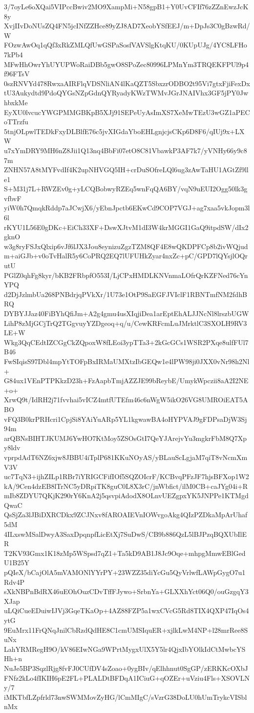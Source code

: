 3/7oyLe6oXQai5VIPccBwiv2MO9XampMi+N58gpB1+Y0UvCFIf76zZZnEwzJcK8y
XvjIIvDoNUsZQ4FN5jcINfZZHce89yZJ8AD7XeobYSfEEJ/m+DpJs3C0gBzwRd/W
FOzwAwOq1qQf3xRkZMLQfUwGSPaSosfVAVSlgKtqKU/0KUpUJg/4YC8LFHo7kPb4
MFwHhOwrYhUYUPWoRaiDBb5gwO8SPoZec80996LPMnYm3TRQEKFPUl9p4f96FTsV
0szRNVYd478RwxaAIRFlqVDSNliAN4lKaQZT5SbxzrODBO2t95Vi7gtxFjiFexDx
tU3Aukydtd9PdoQYGsNZpGdnQYRyadyKWzTWMvJGrJNAIVhx3GF5jPY0JwhbxkMe
EyXU0lvcucYWGPMMGBKpB5XJj91SEPeUyAsImXS7XeMwTEzU3wGZ1aPECoTTrzfu
5tnjOLpwlTEDkFxyDLBlfE76c5jvXIGdaYboEHLgnjcjsCKp6D8F6/qIUj9x+LXW
u7xYmDRY9MH6nZ8Jii1Q13nq4BbFi07etO8C81VbawkP3AF7k7/yVNHy66y9c87m
ZNHN57A8tMYFvdIf4K2upNHVGQ5IH+crDuSOfreLQl6ug3zAwTaHU1AGtZf9lle1
S+M31j7L+RWZEv0g+yLCQBobwyRZEq5wnFqQA6BY/vqN9uEUI2Ogg50lk3gvfbvF
yiW0h7QmqkRddp7aJCwjX6/yEbnJpctb6EKwCd9COP7VGJ+ag7xaa5vkJopm3l6l
rKYU1L56E0gDKc+EiCh33XF+DswXJtvM1dI3W4krMGGI1GaQ9itpdSW/dIx2gknO
w3g8ryFSJxQlxip6vJf6lJX3Jou8eynizuZgzTZM8QF4E8wQKDPFCp8b2ivWQjud
m+aiGJb+v0oTvHalR5y6CoPRQ2EQ7lUFUHkZyar4nxZc+pC/GPD7lQYsjlOQrutU
PGlZ0qhFg8kyr/bKB2FRbpfO553I/LjCPxHMDLKNVnmaLOfrQrKZFNed76cYnYPQ
d2DjJzlmbUa268PNBdrjqPVkXr/1U73e1OtP9SaEGFJVIclF1RBNTmfNM2fdhBRQ
DYBYJJaz40FiBYhQfiJm+A2g4gmu4usXIqjiDea1arEptEhALJJNcNl8lrszbUGW
LihP8zMjGCjTrQ2TGgvuyYZDgeoq+q/u/CewKRFcmLuJMrktlC3SXOLH9RV3LE+W
Wkg3QqCEdtIZCGgCkZQpoxW8fLEoi3ypTTa3+2kGcGCs1WSR2PXqe8ulfFUl7B46
FwSIqisS97Dbl4mpYtTOFpBxIRMaUMXtzIbGEQw1e4lPW98ji0JXX0vNr98h2Nl+
G84ux1VEnPTPKkzD23h+FzAapbTmjAZZJE99bReybE/UmykWpczii8aA2I2NE+o+
XrwQ9t/IdRH2j71fvvhai5vICZ4mtfUTEfm46c6nWgW5ikO26VG8UMROiEAT5ABO
vFQ3B0krPRHcri1CpjSi8YAiYuARp5YL1kgwawBA4oHYPVAJ9gFDPsaDjW3Sj94m
arQBNsBIHTJKUMJ6YwHO7KtMoy5ZSOsGtI7QeYJArejvYu3mgkrFbM8Q7Xpy8ldv
vprpdAdT6NZ6xjw8JBBU4iTplP681KKuNOyAS/yBLauScLgjaM7qiT8vNcmXmV3V
uc7TqN3+ijhZILp1RBr7iYRIGCFifIOf5SQZOIcrF/KCBvqPFzJF7hjsBFXop1W2
kA/9Cen4dzEB8lTrNC5yDRpiTK8guC0L8X3rC/jnWbfict/ilM0CB+caJYg04i+R
mIb8ZDYU7QKjK290rY6KnA2j5qsvpiAdodX8OLnvUEZgpxYK5JNPPe1KTMgdQwaC
QsSjZa3lJBiDXRCDkx9ZCJNxv8fAROAIEVnIOWvgoAkg4QIzPZDkaMpArUhaf5dM
4ILxswMSalDwyA3SaxDpqnpfLicEtXj7SuDwS/CB9b886QzL5lBJPzqBQXUbIlER
T2KV93Gmx1K18zMp5WSpsd7qZ1+Ta5kD9AB1J8Jc9Oqe+mhpgMmwEBlGedU1B25Y
pQIeX/bCajOlA5mVAMONlYYrPY+23WZZ35diYcGu5QyVrlwfLAWpGygO7u1Rdv4P
sXkNBPnBdRX46uEOhOuzCDvTffFJywo+SrbnYa+GLXXhYct06Q0/ouGzgqY3XJap
uLQiCueEDuiwIJVj3GqeTKaOp+4AZ88FZP5a1wxCVcG5Rd8TIX4QXP47IqOs4ytG
9EuMrx11FrQNqJnilCbRzdQdHE8C1cmUMSIquER+xjlkLwM4NP+l28mrRee8SuNx
LahYRMRegH9O/kV86EIwNGa9WPrtMygxUlX5Y5lr4QjxIbYOlkIdCtMwbcYSHh+n
NuJe5BP3SqzlRjg8fvFJ0CUfDV4sZoao+0ygBIv/qElhhnut0SgGP/zERKKcOXbJ
FNfz2kLo4fIKIH6pE2FL+PLALDtBFDqA1ICiuG+qOZEr+uVziu4Fls+XSOVLNy/7
iMKTbfLZpfrld73nwSWMMovZyHG/lCmMIgC/sVzrG38DoLU0hUmTrykcVISblnMx
